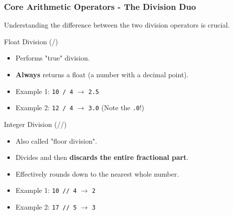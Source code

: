 \documentclass{beamer}
\begin{document}
\begin{frame}[fragile]
    \frametitle{Core Arithmetic Operators - The Division Duo}
    Understanding the difference between the two division operators is crucial.

    \begin{block}{Float Division (/)}
        \begin{itemize}
            \item Performs "true" division.
            \item \textbf{Always} returns a float (a number with a decimal point).
            \item Example 1: \texttt{10 / 4} $\rightarrow$ \texttt{2.5}
            \item Example 2: \texttt{12 / 4} $\rightarrow$ \texttt{3.0} (Note the \texttt{.0}!)
        \end{itemize}
    \end{block}

    \begin{block}{Integer Division (//)}
        \begin{itemize}
            \item Also called "floor division".
            \item Divides and then \textbf{discards the entire fractional part}.
            \item Effectively rounds down to the nearest whole number.
            \item Example 1: \texttt{10 // 4} $\rightarrow$ \texttt{2}
            \item Example 2: \texttt{17 // 5} $\rightarrow$ \texttt{3}
        \end{itemize}
    \end{block}
\end{frame}
\end{document}
